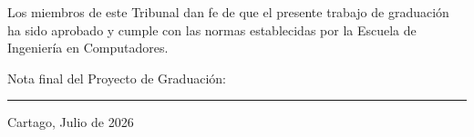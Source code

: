\vfill

Los miembros de este Tribunal dan fe de que el presente trabajo de graduación
ha sido aprobado y cumple con las normas establecidas por la Escuela de Ingeniería en Computadores.

\vfill

\begin{center}
  Nota final del Proyecto de Graduación: \rule{3cm}{0.5pt}
\end{center}
\vfill

\begin{center}
  Cartago, Julio de 2026\par
\end{center}

\cleardoublepage

